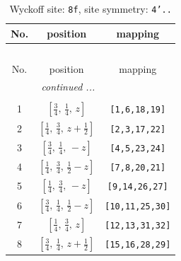 \documentclass[fleqn,8pt]{jsarticle}
\begin{document}
\begin{longtable}{ccc}
\caption{Wyckoff site: {\tt 8f}, site symmetry: {\tt 4'..}}
 \\
 \hline \hline
No. & position & mapping \\ \hline \endfirsthead

\multicolumn{2}{l}{\tablename\ \thetable{}} \\
 \hline \hline
No. & position & mapping \\ \hline \endhead

 \hline \hline
\multicolumn{2}{r}{\footnotesize\it continued ...} \\ \endfoot

 \hline \hline
\multicolumn{2}{r}{} \\ \endlastfoot

1 & $\left[ \frac{3}{4},\, \frac{1}{4},\, z \right]$ & {\tt [1,6,18,19]} \\ \hline
2 & $\left[ \frac{1}{4},\, \frac{3}{4},\, z + \frac{1}{2} \right]$ & {\tt [2,3,17,22]} \\ \hline
3 & $\left[ \frac{3}{4},\, \frac{1}{4},\, - z \right]$ & {\tt [4,5,23,24]} \\ \hline
4 & $\left[ \frac{1}{4},\, \frac{3}{4},\, \frac{1}{2} - z \right]$ & {\tt [7,8,20,21]} \\ \hline
5 & $\left[ \frac{1}{4},\, \frac{3}{4},\, - z \right]$ & {\tt [9,14,26,27]} \\ \hline
6 & $\left[ \frac{3}{4},\, \frac{1}{4},\, \frac{1}{2} - z \right]$ & {\tt [10,11,25,30]} \\ \hline
7 & $\left[ \frac{1}{4},\, \frac{3}{4},\, z \right]$ & {\tt [12,13,31,32]} \\ \hline
8 & $\left[ \frac{3}{4},\, \frac{1}{4},\, z + \frac{1}{2} \right]$ & {\tt [15,16,28,29]} \\
\end{longtable}
\renewcommand{\arraystretch}{1.2}
\end{document}

